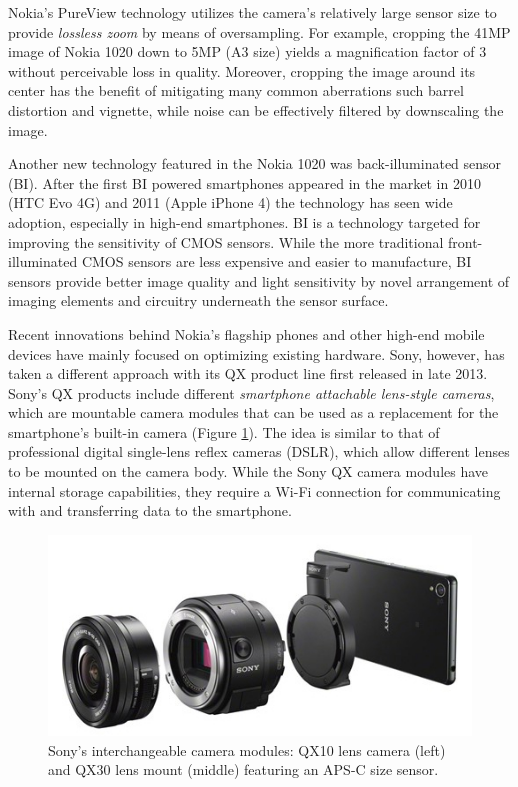 \documentclass[thesis.tex]{subfiles}
\begin{document}
Nokia's PureView technology utilizes the camera's relatively large sensor size to provide \textit{lossless zoom} by means of oversampling. For example, cropping the 41MP image of Nokia 1020 down to 5MP (A3 size) yields a magnification factor of 3 without perceivable loss in quality. Moreover, cropping the image around its center has the benefit of mitigating many common aberrations such barrel distortion and vignette, while noise can be effectively filtered by downscaling the image. \cite{lumia_1020}

Another new technology featured in the Nokia 1020 was back-illuminated sensor (BI). After the first BI powered smartphones appeared in the market in 2010 (HTC Evo 4G) and 2011 (Apple iPhone 4) the technology has seen wide adoption, especially in high-end smartphones. BI is a technology targeted for improving the sensitivity of CMOS sensors. While the more traditional front-illuminated CMOS sensors are less expensive and easier to manufacture, BI sensors provide better image quality and light sensitivity by novel arrangement of imaging elements and circuitry underneath the sensor surface.

Recent innovations behind Nokia's flagship phones and other high-end mobile devices have mainly focused on optimizing existing hardware. Sony, however, has taken a different approach with its QX product line first released in late 2013. Sony's QX products include different \textit{smartphone attachable lens-style cameras}, which are mountable camera modules that can be used as a replacement for the smartphone's built-in camera (Figure \ref{figure:sony-qx}). The idea is similar to that of professional digital single-lens reflex cameras (DSLR), which allow different lenses to be mounted on the camera body. While the Sony QX camera modules have internal storage capabilities, they require a Wi-Fi connection for communicating with and transferring data to the smartphone.

\begin{figure}[h]
\centering \includegraphics[width=\textwidth]{images/sony_qx.jpg}
\caption{Sony's interchangeable camera modules: QX10 lens camera (left) and QX30 lens mount (middle) featuring an APS-C size sensor.\label{figure:sony-qx} \cite{sony_qx}}
\end{figure}
\end{document}
